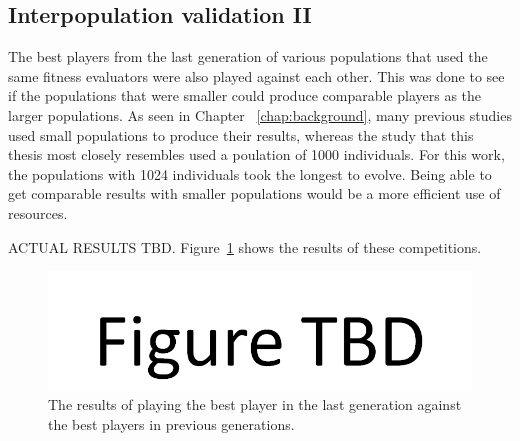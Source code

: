 \subsection{Interpopulation validation II}

The best players from the last generation of various populations that used
the same fitness evaluators were also played against each other. This was done
to see if the populations that were smaller could produce comparable
players as the larger populations. As seen in Chapter ~\ref{chap:background},
many previous studies used small populations to produce their results, whereas
the study that this thesis most closely resembles used a poulation of 1000
individuals. For this work, the populations with 1024 individuals took the
longest to evolve. Being able to get comparable results with smaller populations
would be a more efficient use of resources.

ACTUAL RESULTS TBD. Figure~\ref{figure-interpopulation2} shows the results of
these competitions.

\begin{figure}[htp]
\centerline{\includegraphics[width=0.75\columnwidth]{Figures/figureTBD.png}}
\caption[Validation - Comparing population sizes]{The results of playing the
best player in the last generation against the best players in previous
generations.}
\label{figure-interpopulation2}
\end{figure}
